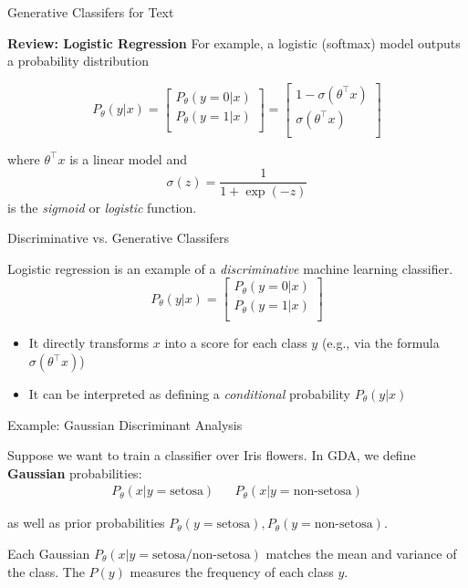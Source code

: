 \documentclass[../../generative_classifiers.tex]{subfiles}
\begin{document}
\begin{frame}[fragile]{Generative Classifers for Text}


\textbf{Review: Logistic Regression
}
For example, a logistic (softmax) model outputs a probability distribution 

$$
P_\theta(y| x) 
= \left[ \begin{array}{c}
P_\theta(y=0| x) \\
P_\theta(y=1| x) \\
\end{array} \right]
= \left[ \begin{array}{c}
1-\sigma(\theta^\top x) \\
\sigma(\theta^\top x) \\
\end{array} \right]
$$

where $\theta^\top x$ is a linear model and
$$\sigma(z) = \frac{1}{1 + \exp(-z)}$$
is the \textit{sigmoid} or \textit{logistic} function.


\end{frame}


\begin{frame}[fragile]{Discriminative vs. Generative Classifers}


Logistic regression is an example of a \textit{discriminative} machine learning classifier.
$$
P_\theta(y| x) 
= \left[ \begin{array}{c}
P_\theta(y=0| x) \\
P_\theta(y=1| x) \\
\end{array} \right]
$$
\begin{itemize}
    \item It directly transforms $x$ into a score for each class $y$ (e.g., via the formula $\sigma(\theta^\top x)$)
    \item It can be interpreted as defining a \textit{conditional} probability $P_\theta(y|x)$
\end{itemize}

\end{frame}





\begin{frame}[fragile]{Example: Gaussian Discriminant Analysis}

Suppose we want to train a classifier over Iris flowers. In GDA, we define \textbf{Gaussian} probabilities:
\begin{align*}
P_\theta(x|y=\text{setosa}) && P_\theta(x|y=\text{non-setosa})
\end{align*}

as well as prior probabilities $P_\theta(y=\text{setosa}), P_\theta(y=\text{non-setosa})$.


\vspace{0.2cm}

Each Gaussian $P_\theta(x|y=\text{setosa/non-setosa})$ matches the mean and variance of the class. The $P(y)$ measures the frequency of each class $y$.

\end{frame}
\end{document}
